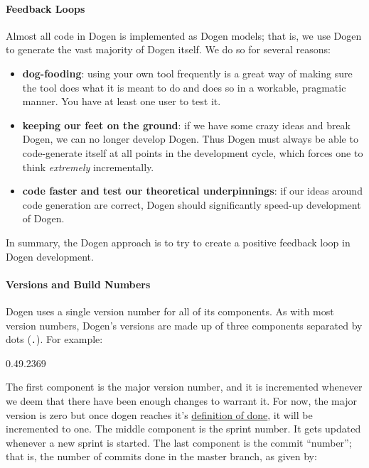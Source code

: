 \documentclass{book}
\begin{document}
\paragraph{Feedback Loops}

Almost all code in Dogen is implemented as Dogen models; that is, we
use Dogen to generate the vast majority of Dogen itself. We do so for
several reasons:

\begin{itemize}
\item \textbf{dog-fooding}: using your own tool frequently is a great
  way of making sure the tool does what it is meant to do and does so
  in a workable, pragmatic manner. You have at least one user to test
  it.
\item \textbf{keeping our feet on the ground}: if we have some crazy
  ideas and break Dogen, we can no longer develop Dogen. Thus Dogen
  must always be able to code-generate itself at all points in the
  development cycle, which forces one to think \emph{extremely}
  incrementally.
\item \textbf{code faster and test our theoretical underpinnings}: if
  our ideas around code generation are correct, Dogen should
  significantly speed-up development of Dogen.
\end{itemize}

In summary, the Dogen approach is to try to create a positive feedback
loop in Dogen development.

\paragraph{Versions and Build Numbers}

Dogen uses a single version number for all of its components. As with
most version numbers, Dogen's versions are made up of three components
separated by dots (\texttt{.}). For example:

\begin{pseudocode}[backgroundcolor=\color{lightgray}]
0.49.2369
\end{pseudocode}

The first component is the major version number, and it is incremented
whenever we deem that there have been enough changes to warrant
it. For now, the major version is zero but once dogen reaches it's
\href{https://github.com/DomainDrivenConsulting/dogen/blob/master/doc/agile/definition_of_done.org}{definition
  of done}, it will be incremented to one. The middle component is the
sprint number. It gets updated whenever a new sprint is started. The
last component is the commit ``number''; that is, the number of commits
done in the master branch, as given by:
\end{document}
